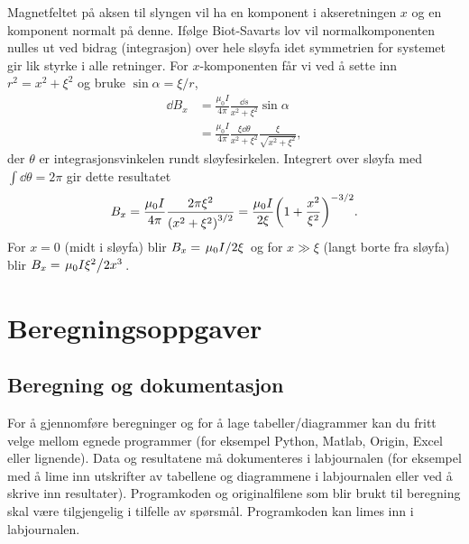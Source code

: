 \documentclass[../Elmag-labhefte-2020.tex]{subfiles}
\begin{document}
Magnetfeltet på aksen til slyngen vil ha en komponent i akseretningen $x$ og en komponent normalt på denne. Ifølge Biot-Savarts lov vil normalkomponenten nulles ut ved bidrag (integrasjon) over hele sløyfa idet symmetrien for systemet gir lik styrke i alle retninger. For $x$-komponenten får vi ved å sette inn $r^2 = x^2 + \xi^2$ og bruke $\sin \alpha = \xi/r$,
%
\begin{align}
    \dd{B_x} &= \frac{\mu_0 I}{4 \pi} \frac{\dd{s}}{x^2 + \xi^2} \sin\alpha \nonumber \\
             &= \frac{\mu_0 I}{4 \pi}  \frac{\xi \dd{\theta}}{x^2 + \xi^2}  \frac{\xi}{\sqrt{x^2 + \xi^2}} ,
\end{align}
der $\theta$ er integrasjonsvinkelen rundt sløyfesirkelen. Integrert over sløyfa med $\int \dd{\theta} = 2\pi$ gir dette resultatet
%
\begin{equation} 
    \label{eq:Biot.Savart3}
    B_x = \frac{\mu_0 I}{4 \pi} \frac{2\pi \xi^2}{\left( x^2 + \xi^2 \right)^{3/2}}
        = \frac{\mu_0 I}{2 \xi} \qty(1 + \frac{x^2}{\xi^2})^{-3/2}.
\end{equation}
For $x = 0$ (midt i sløyfa) blir $B_x = \flatfrac{\mu_0 I}{2\xi}$ og for $x \gg \xi$ (langt borte fra sløyfa) blir $B_x = \flatfrac{\mu_0 I\xi^2}{2x^3}$.


\section{Beregningsoppgaver \label{ch.magnetfelt.beregn}}

\subsection{Beregning og dokumentasjon  \label{ch.magnetfelt.regneark} }

For å gjennomføre beregninger og for å lage tabeller/diagrammer kan du fritt velge mellom egnede programmer (for eksempel Python, Matlab, Origin, Excel eller lignende). Data og resultatene må dokumenteres i labjournalen (for eksempel med å lime inn utskrifter av tabellene og diagrammene i labjournalen eller ved å skrive inn resultater). Programkoden og originalfilene som blir brukt til beregning skal være tilgjengelig i tilfelle av spørsmål. Programkoden kan limes inn i labjournalen.
\end{document}
